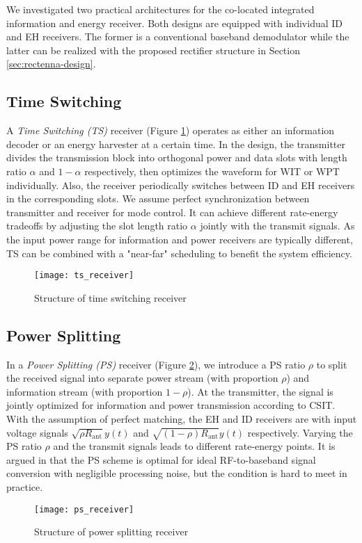 We investigated two practical architectures for the co-located integrated information and energy receiver. Both designs are equipped with individual ID and EH receivers. The former is a conventional baseband demodulator while the latter can be realized with the proposed rectifier structure in Section \ref{sec:rectenna-design}.



\subsection{Time Switching}\label{sec:time-switching}
A \textit{Time Switching (TS)} receiver (Figure \ref{fig:ts-receiver}) operates as either an information decoder or an energy harvester at a certain time. In the design, the transmitter divides the transmission block into orthogonal power and data slots with length ratio $\alpha $ and $1 - \alpha $ respectively, then optimizes the waveform for WIT or WPT individually. Also, the receiver periodically switches between ID and EH receivers in the corresponding slots. We assume perfect synchronization between transmitter and receiver for mode control. It can achieve different rate-energy tradeoffs by adjusting the slot length ratio $\alpha $ jointly with the transmit signals. As the input power range for information and power receivers are typically different, TS can be combined with a "near-far" scheduling \cite{Zhang2013} to benefit the system efficiency.

\begin{figure}
  \centering
    \texttt{[image: ts\_receiver]}
  \caption{Structure of time switching receiver \cite{Clerckx2019}}
  \label{fig:ts-receiver}
\end{figure}



\subsection{Power Splitting}\label{sec:power-splitting}
In a \textit{Power Splitting (PS)} receiver (Figure \ref{fig:ps-receiver}), we introduce a PS ratio $\rho $ to split the received signal into separate power stream (with proportion $\rho $) and information stream (with proportion $1 - \rho $). At the transmitter, the signal is jointly optimized for information and power transmission according to CSIT. With the assumption of perfect matching, the EH and ID receivers are with input voltage signals $\sqrt {\rho {R_{{\text{ant}}}}} y(t)$ and $\sqrt {(1 - \rho ){R_{{\text{ant}}}}} y(t)$ respectively. Varying the PS ratio $\rho $ and the transmit signals leads to different rate-energy points. It is argued in \cite{Zhang2013} that the PS scheme is optimal for ideal RF-to-baseband signal conversion with negligible processing noise, but the condition is hard to meet in practice.

\begin{figure}
  \centering
    \texttt{[image: ps\_receiver]}
  \caption{Structure of power splitting receiver \cite{Clerckx2019}}
  \label{fig:ps-receiver}
\end{figure} 